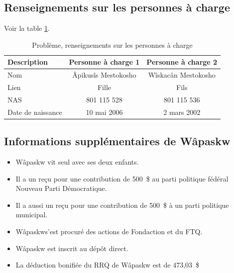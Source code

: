 \subsection{Renseignements sur les personnes à charge}
Voir la table \ref{table:chapitre5ProblemeRenseignementsPersonnesACharge}.
\begin{table}
	\centering
	\begin{tabular}{|l|c|c|}
		\hline
		\rowcolor{LightGreen} Description & Personne à charge 1 & Personne à charge 2 \\ \hline
		Nom                               & Âpikusîs Mestokosho & Wîskacân Mestokosho \\ \hline
		Lien                              &        Fille        &        Fils         \\ \hline
		NAS                               &     801 115 528     &     801 115 536     \\ \hline
		Date de naissance                 &     10 mai 2006     &     2 mars 2002     \\ \hline
	\end{tabular}
	\caption[]{Problème, renseignements sur les personnes à charge}
	\label{table:chapitre5ProblemeRenseignementsPersonnesACharge}
\end{table}


\subsection{Informations supplémentaires de Wâpaskw}
\begin{itemize}
	\item Wâpaskw vit seul avec ses deux enfants.
	\item Il a un reçu pour une contribution de 500~\$ au parti politique fédéral Nouveau Parti Démocratique.
	\item Il a aussi un reçu pour une contribution de 500~\$ à un parti politique municipal.
	\item Wâpaskws'est procuré des actions de Fondaction et du FTQ.
	\item Wâpaskw est inscrit au dépôt direct.
	\item La déduction bonifiée du RRQ de Wâpaskw est de 473,03~\$
\end{itemize}


